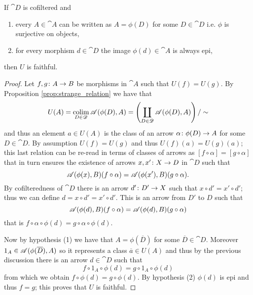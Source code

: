 \begin{lemma}
  \label{lemma:U_faithful}
  If \(\cat{D}\) is cofiltered and
  \begin{enumerate}[label=(\arabic*)]
  \item every \(A\in\cat{A}\) can be written as \(A = \phi(D)\) for some \(D\in\cat{D}\) i.e. \(\phi\) is surjective on objects,
  \item for every morphism \(d\in\cat{D}\) the image \(\phi(d)\in\cat{A}\) is always epi,
  \end{enumerate}
  then \(U\) is faithful.
\end{lemma}

\begin{proof}
  Let \(f,g\colon A\to B\) be morphisms in \(\cat{A}\) such that \(U(f) = U(g)\). By Proposition \ref{prop:strange_relation} we have that
  \begin{equation*}
    U(A) = \operatorname*{colim}_{D\in{\mathscr D}}{\mathscr A}(\phi(D),A)=\left(\coprod_{D\in{\mathscr D}}{\mathscr A}(\phi(D),A)\right)/\sim
  \end{equation*}
  and thus an element \(a\in U(A)\) is the class of an arrow \(\alpha\colon \phi(D)\to A\) for some \(D\in\cat{D}\). By assumption \(U(f) = U(g)\) and thus \(U(f)(a) = U(g)(a)\); this last relation can be re-read in terms of classes of arrows as \([f\circ\alpha] = [g\circ\alpha]\) that in turn ensures the existence of arrows \(x,x'\colon X\to D\) in \(\cat{D}\) such that
  \begin{equation*}
    {\mathscr A}(\phi(x),B)(f\circ\alpha) = {\mathscr A}(\phi(x'),B)(g\circ\alpha).
  \end{equation*}
  By cofilteredness of \(\cat{D}\) there is an arrow \(d'\colon D'\to X\) such that \(x\circ d' = x'\circ d'\); thus we can define \(d = x\circ d' = x'\circ d'\). This is an arrow from \(D'\) to \(D\) such that
  \begin{equation*}
    {\mathscr A}(\phi(d),B)(f\circ\alpha) = {\mathscr A}(\phi(d),B)(g\circ\alpha)
  \end{equation*}
  that is \(f\circ\alpha\circ\phi(d) = g\circ\alpha\circ\phi(d)\).

  Now by hypothesis (1) we have that \(A = \phi(\overline{D})\) for some \(\overline{D}\in\cat{D}\). Moreover \(1_A\in{\mathscr A}(\phi(\overline{D}),A)\) so it represents a class \(\overline{a}\in U(A)\) and thus by the previous discussion there is an arrow \(d\in\cat{D}\) such that
    \begin{equation*}
      f\circ 1_A\circ\phi(d) = g\circ 1_A\circ\phi(d)
    \end{equation*}
    from which we obtain \(f\circ\phi(d) = g\circ\phi(d)\). By hypothesis (2) \(\phi(d)\) is epi and thus \(f = g\); this proves that \(U\) is faithful.
\end{proof}

